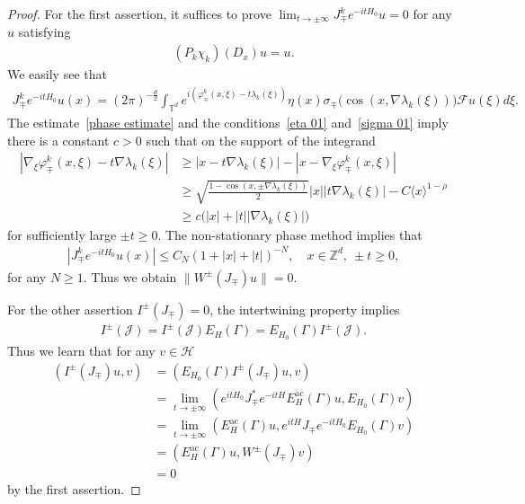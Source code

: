 \documentclass[10pt,a4paper]{amsart}
\newcommand{\f}{\varphi}
\newcommand{\x}{\xi}
\newcommand{\s}{\sigma}
\newcommand{\Z}{\mathbb{Z}}
\newcommand{\T}{\mathbb{T}}
\newcommand{\HS}{\mathcal{H}}
\newcommand{\JS}{\mathcal{J}}
\newcommand{\FS}{\mathcal{F}}
\newcommand{\ac}{\mathrm{ac}}
\newcommand{\jap}[1]{\langle #1 \rangle}
\begin{document}
\begin{proof}
For the first assertion, it suffices to prove $\lim_{t\to\pm\infty} J_\mp^k e^{-itH_0}u=0$ for any $u$ satisfying
\begin{align*}
(P_k\chi_k)(D_x)u=u.
\end{align*}
We easily see that
\begin{align*}
J_\mp^k e^{-itH_0} u(x) 
=(2\pi)^{-\frac{d}{2}} \int_{\T^d} e^{i\left(\f_\mp^k(x,\x)-t\lambda_k(\x)\right)} \eta(x)\s_\mp\bigl(\cos(x,\nabla\lambda_k(\x))\bigr) \FS u(\x)d\x.
\end{align*}
The estimate~\eqref{phase estimate} and the conditions~\eqref{eta 01} and~\eqref{sigma 01} imply there is a constant $c>0$ such that on the support of the integrand
\begin{align*}
\left|\nabla_\x \f_\mp^k(x,\x)-t\nabla\lambda_k(\x)\right|
&\geq |x-t\nabla\lambda_k(\x)| - \left|x-\nabla_\x\f_\mp^k(x,\x)\right| \\
&\geq \sqrt{\frac{1-\cos(x,\pm\nabla\lambda_k(\x))}{2}}|x| |t\nabla\lambda_k(\x)| - C\jap{x}^{1-\rho} \\
&\geq c \big(|x| + |t| |\nabla\lambda_k(\x)|\big)
\end{align*}
for sufficiently large $\pm t \geq 0$. The non-stationary phase method implies that
\begin{align*}
\left|J_\mp^k e^{-itH_0} u(x)\right|\leq C_{N}(1+|x|+|t|)^{-N}, \quad x\in\Z^d,\ \pm t \geq0,
\end{align*}
for any $N\geq1$. Thus we obtain $\|W^\pm(J_\mp)u\| = 0$.

For the other assertion $I^\pm(J_\mp) = 0$, the intertwining property implies
\begin{align*}
I^\pm(\JS)=I^\pm(\JS) E_H(\Gamma) = E_{H_0}(\Gamma) I^\pm(\JS).
\end{align*}
Thus we learn that for any $v\in\HS$
\begin{align*}
\left(I^\pm(J_\mp)u, v\right) &= \left(E_{H_0}(\Gamma) I^\pm(J_\mp)u, v\right) \\
&= \lim_{t\to\pm\infty} \left(e^{itH_0} J_\mp^* e^{-itH} E_{H}^{\ac}(\Gamma) u, E_{H_0}(\Gamma) v\right) \\
&= \lim_{t\to\pm\infty} \left(E_{H}^{\ac}(\Gamma) u, e^{itH} J_\mp e^{-itH_0} E_{H_0}(\Gamma) v\right) \\
&= \left(E_{H}^{\ac}(\Gamma) u, W^\pm(J_\mp) v\right) \\
&= 0
\end{align*}
by the first assertion.
\end{proof}
\end{document}
